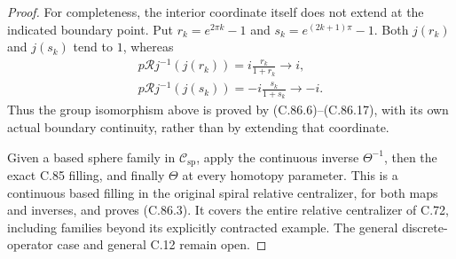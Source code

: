 \begin{proof}
For completeness, the interior
coordinate itself does not extend
at the indicated boundary point.
Put $r_k=e^{2\pi k}-1$ and
$s_k=e^{(2k+1)\pi}-1$.
Both $j(r_k)$ and $j(s_k)$ tend to
$1$, whereas
\[
 \begin{gathered}
 p\mathcal Rj^{-1}(j(r_k))
        =i\frac{r_k}{1+r_k}\longrightarrow i,\\
 p\mathcal Rj^{-1}(j(s_k))
        =-i\frac{s_k}{1+s_k}\longrightarrow-i.
 \end{gathered}                                                   \tag{C.86.18}
\]
Thus the group isomorphism above
is proved by (C.86.6)--(C.86.17),
with its own actual boundary
continuity, rather than by extending
that coordinate.

Given a based sphere family in
$\mathscr C_{\mathrm{sp}}$, apply
the continuous inverse $\Theta^{-1}$,
then the exact C.85 filling, and
finally $\Theta$ at every homotopy
parameter. This is a continuous
based filling in the original
spiral relative centralizer, for
both maps and inverses, and proves
(C.86.3). It covers the entire
relative centralizer of C.72,
including families beyond its
explicitly contracted example.
The general discrete-operator case
and general C.12 remain open.
\end{proof}
